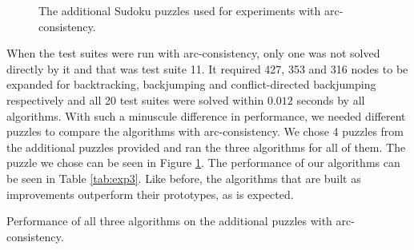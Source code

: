 \begin{center}
  \begin{figure}[ht]
    \centering
    \def\scale{.35} %
    
    \caption{The additional Sudoku puzzles used for experiments with arc-consistency.}
    \label{fig:exp3}
  \end{figure}
\end{center}

When the test suites were run with arc-consistency, only one was not solved directly by it and that was test suite 11. It required 427, 353 and 316 nodes to be expanded for backtracking, backjumping and conflict-directed backjumping respectively and all 20 test suites were solved within $0.012$ seconds by all algorithms. With such a minuscule difference in performance, we needed different puzzles to compare the algorithms with arc-consistency. We chose 4 puzzles from the additional puzzles provided and ran the three algorithms for all of them. The puzzle we chose can be seen in Figure \ref{fig:exp3}. The performance of our algorithms can be seen in Table \ref{tab:exp3}. Like before, the algorithms that are built as improvements outperform their prototypes, as is expected.

\begin{center}     
  \begin{table}[ht]
    \centering
    
    \caption{Performance of all three algorithms on the additional puzzles with arc-consistency.}
    \label{tab:exp3}
  \end{table}
\end{center}